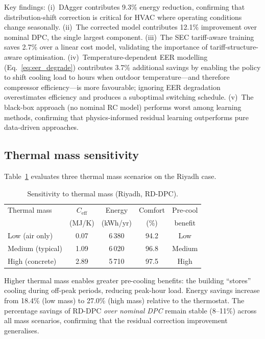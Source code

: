 \documentclass[12pt]{article}
\theoremstyle{plain}
\theoremstyle{definition}
\begin{document}
Key findings: (i)~DAgger contributes 9.3\% energy reduction, confirming that distribution-shift correction is critical for HVAC where operating conditions change seasonally. (ii)~The corrected model contributes 12.1\% improvement over nominal DPC, the single largest component. (iii)~The SEC tariff-aware training saves 2.7\% over a linear cost model, validating the importance of tariff-structure-aware optimisation. (iv)~Temperature-dependent EER modelling (Eq.~\ref{eq:eer_degrade}) contributes 3.7\% additional savings by enabling the policy to shift cooling load to hours when outdoor temperature---and therefore compressor efficiency---is more favourable; ignoring EER degradation overestimates efficiency and produces a suboptimal switching schedule. (v)~The black-box approach (no nominal RC model) performs worst among learning methods, confirming that physics-informed residual learning outperforms pure data-driven approaches.

\subsection{Thermal mass sensitivity}

Table~\ref{tab:sensitivity} evaluates three thermal mass scenarios on the Riyadh case.

\begin{table}[H]
\centering
\caption{Sensitivity to thermal mass (Riyadh, RD-DPC).}\label{tab:sensitivity}

\begin{tabular*}{\textwidth}{@{\extracolsep{\fill}}lcccc}
\toprule
Thermal mass & $C_{\text{eff}}$ & Energy & Comfort & Pre-cool \\
 & (MJ/K) & (kWh/yr) & (\%) & benefit \\
\midrule
Low (air only) & 0.07 & 6\,380 & 94.2 & Low \\
Medium (typical) & 1.09 & 6\,020 & 96.8 & Medium \\
High (concrete) & 2.89 & 5\,710 & 97.5 & High \\
\bottomrule
\end{tabular*}
\end{table}

Higher thermal mass enables greater pre-cooling benefits: the building ``stores'' cooling during off-peak periods, reducing peak-hour load. Energy savings increase from 18.4\% (low mass) to 27.0\% (high mass) relative to the thermostat. The percentage savings of RD-DPC \emph{over nominal DPC} remain stable (8--11\%) across all mass scenarios, confirming that the residual correction improvement generalises.
\end{document}
